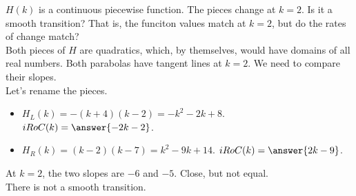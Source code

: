 \documentclass{ximera}
\begin{document}
\begin{exercise}
$H(k)$ is a continuous piecewise function.  The pieces change at $k = 2$.  Is it a smooth transition?  That is, the funciton values match at $k = 2$, but do the rates of change match? \\


Both pieces of $H$ are quadratics, which, by themselves, would have domains of all real numbers.  Both parabolas have tangent lines at $k = 2$.  We need to compare their slopes. \\



Let's rename the pieces. \\

\begin{itemize}
\item   $H_L(k) = -(k+4)(k-2) = -k^2 - 2k + 8$. $iRoC(k) = \answer{-2k - 2}$.
\item   $H_R(k) = (k-2)(k-7) = k^2 - 9k + 14$. $iRoC(k) = \answer{2k - 9}$.
\end{itemize}



At $k = 2$, the two slopes are $-6$ and $-5$.  Close, but not equal. \\

There is not a smooth transition.









\end{exercise}
\end{document}
